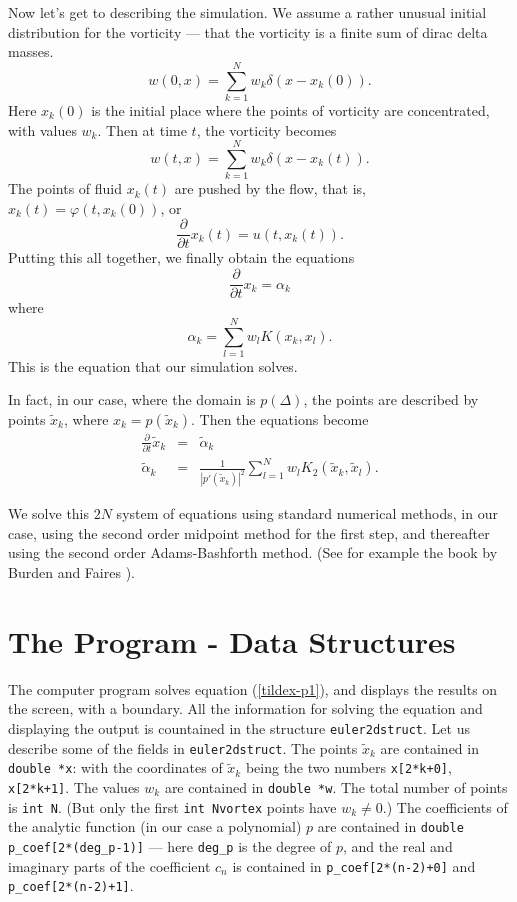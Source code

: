 \documentclass[12pt]{article}
\begin{document}
Now let's get to describing the simulation.  We assume a rather
unusual initial distribution for the vorticity --- that the
vorticity is a finite sum of dirac delta masses.
\[ w(0,x) = \sum_{k=1}^N w_k \delta(x-x_k(0)) .\]
Here $x_k(0)$ is the initial place where the points
of vorticity are concentrated, with values $w_k$.  
Then at time $t$, the vorticity becomes
\[ w(t,x) = \sum_{k=1}^N w_k \delta(x-x_k(t)) .\]
The points of fluid $x_k(t)$ are pushed by the
flow, that is, $x_k(t) = \varphi(t,x_k(0))$, or
\[ \frac{\partial}{\partial t} x_k(t) = u(t,x_k(t)) .\]
Putting this all together, we finally obtain the equations
\[ \frac{\partial}{\partial t} x_k = \alpha_k \]
where
\[ \alpha_k   = \sum_{l=1}^N w_l K(x_k,x_l) .\]
This is the equation that our simulation solves.

In fact, in our case, where the domain is $p(\Delta)$,
the points are described by points
$\tilde x_k$, where $x_k = p(\tilde x_k)$.  Then
the equations become
\begin{eqnarray}
\label{tildex-p1}
\frac{\partial}{\partial t} \tilde x_k &=& \tilde\alpha_k \\
\label{tildex-p2}
\tilde\alpha_k &=& \frac1{|p'(\tilde x_k)|^2}
     \sum_{l=1}^N w_l K_2(\tilde x_k,\tilde x_l) .
\end{eqnarray}

We solve this $2N$ system of equations using standard
numerical methods, in our case, using the second order midpoint method
for the first step, and thereafter using the second order Adams-Bashforth 
method.  (See for example the book
by Burden and Faires \cite{BF}).

\section{The Program - Data Structures}

The computer program solves equation (\ref{tildex-p1}), and displays
the results on the screen, with a boundary.  All the information
for solving the equation and displaying the output is countained
in the structure {\tt euler2dstruct}.  Let us describe some of
the fields in {\tt euler2dstruct}.  
The points $\tilde x_k$ are contained 
in {\tt double *x}: with the coordinates of
$\tilde x_k$ being the two numbers
{\tt x[2*k+0]}, {\tt x[2*k+1]}.  The values $w_k$ are contained
in {\tt double *w}.  The total number of points is
{\tt int N}.  (But only the first {\tt int Nvortex} points
have $w_k \ne 0$.)  The coefficients of the analytic function
(in our case a polynomial) $p$
are contained in {\tt double p\_coef[2*(deg\_p-1)]} --- here
{\tt deg\_p} is the degree of $p$, and the real and imaginary
parts of the coefficient
$c_n$ is contained in {\tt p\_coef[2*(n-2)+0]} and {\tt p\_coef[2*(n-2)+1]}.
\end{document}

